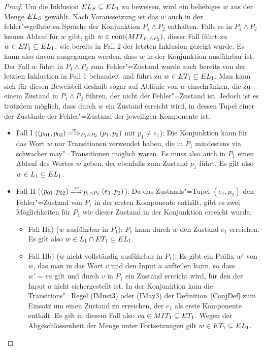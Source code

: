 \begin{proof}
  Um die Inklusion $EL _S\subseteq EL _1$ zu beweisen, wird ein beliebiges $w$
  aus der Menge $EL _S$ gewählt. Nach Voraussetzung ist das $w$ auch in der
  fehler"=gefluteten Sprache der Konjunktion $P_1\land P_2$ enthalten. Falls
  es in $P_1\land P_2$ keinen Ablauf für $w$ gibt, gilt $w\in\mathrm{cont} (MIT
  _{P_1\land P_2})$, dieser Fall führt zu $w\in ET _1\subseteq EL _1$, wie
  bereits in Fall 2 der letzten Inklusion gezeigt wurde. Es kann also davon
  ausgegangen werden, dass $w$ in der Konjunktion ausführbar ist. Der Fall $w$
  führt in $P_1\land P_2$ zum Fehler"=Zustand wurde auch bereits von der
  letzten Inklustion in Fall 1 behandelt und führt zu $w\in ET _1\subseteq EL
  _1$. Man kann sich für diesen Beweisteil deshalb sogar auf Abläufe von $w$
  einschränken, die zu einem Zustand in $P_1\land P_2$ führen, der nicht der
  Fehler"=Zustand ist. Jedoch ist es trotzdem möglich, dass durch $w$ ein
  Zustand erreicht wird, in dessen Tupel einer der Zustände der Fehler"=Zustand
  der jeweiligen Komponente ist.
  \begin{itemize}
    \item Fall I ($(p_{01},p_{02})\weakmay[w]_{P_1\land P_2} (p_1,p_2)$ mit
      $p_1\neq e_1$): Die Konjunktion kann für das Wort $w$ nur Transitionen
      verwendet haben, die in $P_1$ mindestens via schwacher may"=Transitionen
      möglich waren. Es muss also auch in $P_1$ einen Ablauf des Wortes $w$
      geben, der ebenfalls zum Zustand $p_1$ führt. Es gilt also $w\in L_1
      \subseteq EL _1$.
    \item Fall II ($(p_{01},p_{02})\weakmay[w]_{P_1\land P_2} (e_1,p_2)$): Da
      das Zustands"=Tupel $(e_1,p_2)$ den Fehler"=Zustand von $P_1$ in der
      ersten Komponente enthält, gibt es zwei Möglichkeiten für $P_1$ wie
      dieser Zustand in der Konjunktion erreicht wurde.
      \begin{itemize}
        \item Fall IIa) ($w$ ausführbar in $P_1$): $P_1$ kann durch $w$ den
          Zustand $e_1$ erreichen. Es gilt also $w\in L_1\cap ET _1\subseteq
          EL _1$.
        \item Fall IIb) ($w$ nicht vollständig ausführbar in $P_1$): Es gibt
          ein Präfix $w'$ von $w$, das man in das Wort $v$ und den Input $a$
          aufteilen kann, so dass $w'=va$ gilt und durch $v$ in $P_1$ ein
          Zustand erreicht wird, für den der Input $a$ nicht sichergestellt
          ist. In der Konjunktion kam die Transitions"=Regel (IMust3) oder
          (IMay3) der Definition~\ref{ConjDef} zum Einsatz um einen Zustand zu
          erreichen, der $e_1$ als erste Komponente enthält. Es gilt in diesem
          Fall also $va\in MIT _1\subseteq ET _1$. Wegen der Abgeschlossenheit
          der Menge \ET{} unter Fortsetzungen gilt $w\in ET _1
      \subseteq EL _1$.
      \end{itemize}
  \end{itemize}
\end{proof}
